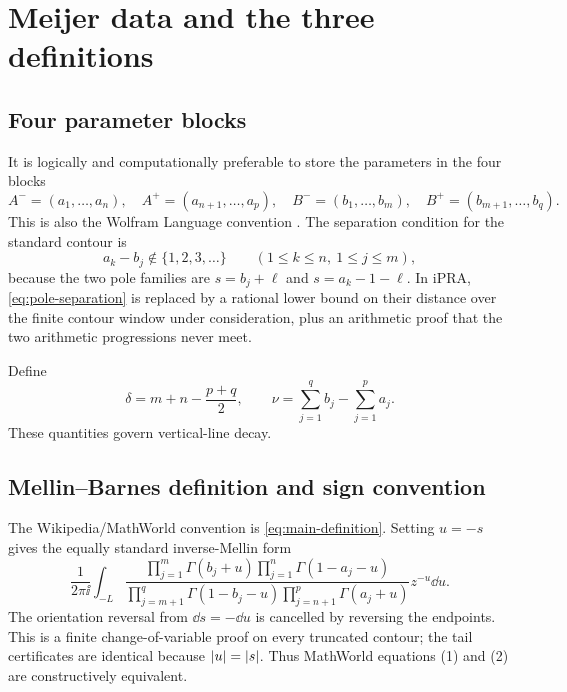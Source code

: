 \section{Meijer data and the three definitions}\label{sec:definitions}

\subsection{Four parameter blocks}

It is logically and computationally preferable to store the parameters in the
four blocks
\[
 A^-=(a_1,\ldots,a_n),\quad A^+=(a_{n+1},\ldots,a_p),\quad
 B^-=(b_1,\ldots,b_m),\quad B^+=(b_{m+1},\ldots,b_q).
\]
This is also the Wolfram Language convention
.
The separation condition for the standard contour is
\begin{equation}\label{eq:pole-separation}
 a_k-b_j\notin\{1,2,3,\ldots\}
 \qquad(1\le k\le n,\ 1\le j\le m),
\end{equation}
because the two pole families are
$s=b_j+\ell$ and $s=a_k-1-\ell$.
In iPRA, \eqref{eq:pole-separation} is replaced by a rational lower bound on
their distance over the finite contour window under consideration, plus an
arithmetic proof that the two arithmetic progressions never meet.

Define
\begin{equation}\label{eq:delta-nu}
 \delta=m+n-\frac{p+q}{2},
 \qquad
 \nu=\sum_{j=1}^{q}b_j-\sum_{j=1}^{p}a_j.
\end{equation}
These quantities govern vertical-line decay.

\subsection{Mellin--Barnes definition and sign convention}

The Wikipedia/MathWorld convention is \eqref{eq:main-definition}.  Setting
$u=-s$ gives the equally standard inverse-Mellin form
\begin{equation}\label{eq:plus-convention}
 \frac1{2\pi\ii}\int_{-L}
 \frac{\prod_{j=1}^{m}\Gamma(b_j+u)
       \prod_{j=1}^{n}\Gamma(1-a_j-u)}
      {\prod_{j=m+1}^{q}\Gamma(1-b_j-u)
       \prod_{j=n+1}^{p}\Gamma(a_j+u)}z^{-u}\dd u.
\end{equation}
The orientation reversal from $\dd s=-\dd u$ is cancelled by reversing the
endpoints.  This is a finite change-of-variable proof on every truncated
contour; the tail certificates are identical because $\left|u\right|=\left|s\right|$.
Thus MathWorld equations (1) and (2) are constructively equivalent.

